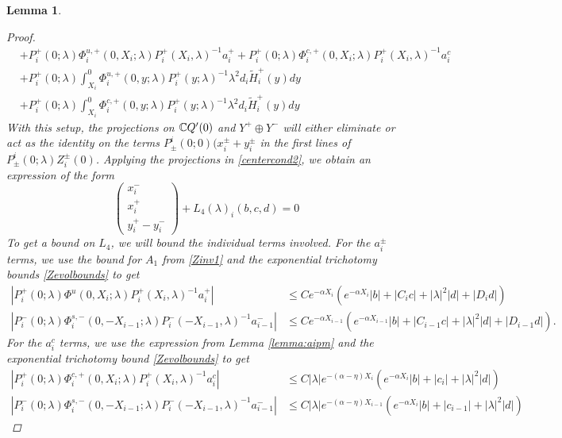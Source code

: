 \documentclass[10pt,reqno]{amsart}
\theoremstyle{plain}
\newtheorem{lemma}[theorem]{Lemma}
\theoremstyle{definition}
\theoremstyle{remark}
\numberwithin{theorem}{section}
\numberwithin{equation}{section}
\begin{document}
\begin{lemma}
\begin{proof}
\begin{align*}
&+ P_i^+(0; \lambda) \Phi_i^{u,+}(0, X_i; \lambda) P_i^+(X_i, \lambda)^{-1} a_i^+ + P_i^+(0; \lambda) \Phi_i^{c,+}(0, X_i; \lambda) P_i^+(X_i, \lambda)^{-1} a_i^c \\
&+ P_i^+(0; \lambda) \int_{X_i}^0 \Phi_i^{u,+}(0, y; \lambda) P_i^+(y; \lambda)^{-1} \lambda^2 d_i \tilde{H}_i^+(y) dy \\
&+ P_i^+(0; \lambda) \int_{X_i}^0 \Phi_i^{c,+}(0, y; \lambda) P_i^+(y; \lambda)^{-1} \lambda^2 d_i \tilde{H}_i^+(y) dy 
\end{align*}
With this setup, the projections on $\mathbb{C} Q'(0)$ and $Y^+ \oplus Y^-$ will either eliminate or act as the identity on the terms $P^i_\pm(0; 0)(x_i^\pm + y_i^\pm$ in the first lines of $P^i_\pm(0; \lambda) Z_i^\pm(0)$. Applying the projections in \eqref{centercond2}, we obtain an expression of the form
\begin{equation}\label{projxy}
\begin{pmatrix}x_i^- \\ x_i^+ \\ 
y_i^+ - y_i^- \end{pmatrix} + L_4(\lambda)_i(b, c, d) = 0
\end{equation}
To get a bound on $L_4$, we will bound the individual terms involved. For the $a_i^\pm$ terms, we use the bound for $A_1$ from \cref{Zinv1} and the exponential trichotomy bounds \cref{Zevolbounds} to get
\begin{align*}
|P_i^+(0; \lambda) \Phi^u(0, X_i; \lambda) P_i^+(X_i, \lambda)^{-1} a_i^+| 
&\leq C e^{-\alpha X_i} \left( e^{-\alpha X_i} |b| + |C_i c| + |\lambda|^2 |d| + |D_i d| \right) \\
|P_i^-(0; \lambda) \Phi_i^{s,-}(0, -X_{i-1}; \lambda) P_i^-(-X_{i-1}, \lambda)^{-1} a_{i-1}^-| &\leq C e^{-\alpha X_{i-1}} \left( e^{-\alpha X_{i-1}} |b| + |C_{i-1} c| + |\lambda|^2 |d| + |D_{i-1} d| \right).
\end{align*}
For the $a_i^c$ terms, we use the expression from Lemma \ref{lemma:aipm} and the exponential trichotomy bound \cref{Zevolbounds} to get
\begin{align*}
|P_i^+(0; \lambda) \Phi_i^{c,+}(0, X_i; \lambda) P_i^+(X_i, \lambda)^{-1} a_i^c| &\leq C |\lambda| e^{-(\alpha - \eta) X_i} \left( e^{-\alpha X_i}  |b| + |c_i| +|\lambda|^2 |d| \right)\\
|P_i^-(0; \lambda) \Phi_i^{s,-}(0, -X_{i-1}; \lambda) P_i^-(-X_{i-1}, \lambda)^{-1} a_{i-1}^-| &\leq C |\lambda| e^{-(\alpha - \eta) X_{i-1}} \left( e^{-\alpha X_i}  |b| + |c_{i-1}| +|\lambda|^2 |d| \right)
\end{align*}

\end{proof}
\end{lemma}
\end{document}
